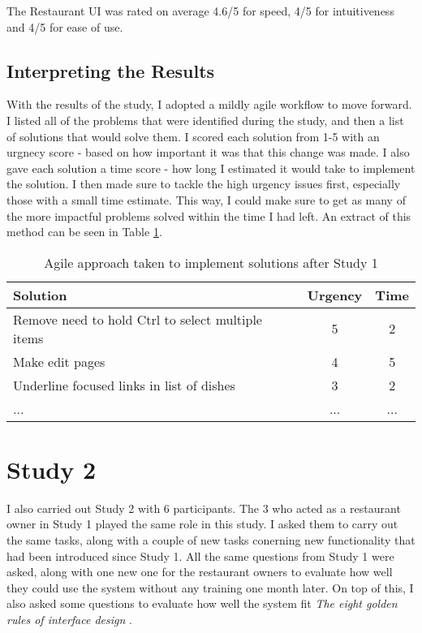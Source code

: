 The Restaurant UI was rated on average 4.6/5 for speed, 4/5 for intuitiveness and 4/5 for ease of use.

\subsection{Interpreting the Results}

With the results of the study, I adopted a mildly agile workflow to move forward. I listed all of the problems that were identified during the study, and then a list of solutions that would solve them. I scored each solution from 1-5 with an urgnecy score - based on how important it was that this change was made. I also gave each solution a time score - how long I estimated it would take to implement the solution. I then made sure to tackle the high urgency issues first, especially those with a small time estimate. This way, I could make sure to get as many of the more impactful problems solved within the time I had left. An extract of this method can be seen in Table \ref{tab:agile}.

\begin{table}[h]
\centering
\begin{tabular}{ |l|c|c| }
\hline
\textbf{Solution} & \textbf{Urgency} & \textbf{Time}\\
\hline
Remove need to hold Ctrl to select multiple items & 5 & 2 \\
\hline
Make edit pages & 4 & 5 \\
\hline
Underline focused links in list of dishes & 3 & 2 \\
\hline
... &  ... & ... \\
\hline
\end{tabular}
\caption{Agile approach taken to implement solutions after Study 1}
\label{tab:agile}
\end{table}

\section{Study 2}
\label{section:Study2Results}

I also carried out Study 2 with 6 participants. The 3 who acted as a restaurant owner in Study 1 played the same role in this study. I asked them to carry out the same tasks, along with a couple of new tasks conerning new functionality that had been introduced since Study 1. All the same questions from Study 1 were asked, along with one new one for the restaurant owners to evaluate how well they could use the system without any training one month later. On top of this, I also asked some questions to evaluate how well the system fit \textit{The eight golden rules of interface design} \cite{shneiderman}.

